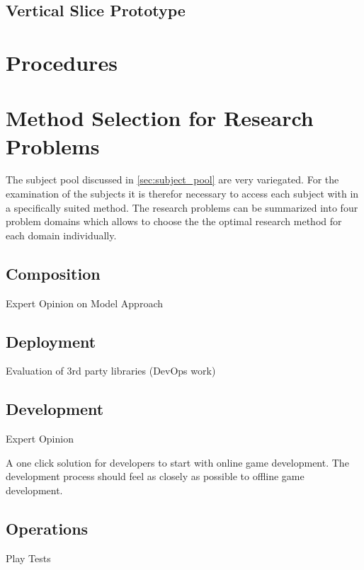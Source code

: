 \subsection{Vertical Slice Prototype}



















\section{Procedures}

\section{Method Selection for Research Problems}

The subject pool discussed in \autoref{sec:subject_pool} are very variegated.
For the examination of the subjects it is therefor necessary to access each
subject with in a specifically suited method. The research problems can be
summarized into four problem domains which allows to choose the the optimal
research method for each domain individually.

\subsection{Composition}
Expert Opinion on Model Approach

\subsection{Deployment}
Evaluation of 3rd party libraries (DevOps work)


\subsection{Development}
Expert Opinion

A one click solution for developers to start with online game
  	  development. The development process should feel as closely as possible to
  	  offline game development.

\subsection{Operations}
Play Tests

